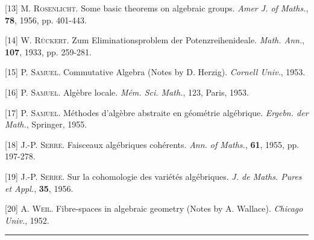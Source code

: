 [13] M. \textsc{Rosenlicht}. Some basic theorems on algebraic groups. \textit{Amer J. of Maths.}, \textbf{78}, 1956, pp. 401-443.

[14] W. \textsc{Rückert}. Zum Eliminationsproblem der Potenzreihenideale. \textit{Math. Ann.}, \textbf{107}, 1933, pp. 259-281.

[15] P. \textsc{Samuel}. Commutative Algebra (Notes by D. Herzig). \textit{Cornell Univ.}, 1953.

[16] P. \textsc{Samuel}. Algèbre locale. \textit{Mém. Sci. Math.}, 123, Paris, 1953.



[17] P. \textsc{Samuel}. Méthodes d'algèbre abstraite en géométrie algébrique. \textit{Ergebn. der Math.}, Springer, 1955.

[18] J.-P. \textsc{Serre}. Faisceaux algébriques cohérents. \textit{Ann. of Maths.}, \textbf{61}, 1955, pp. 197-278.

[19] J.-P. \textsc{Serre}. Sur la cohomologie des variétés algébriques. \textit{J. de Maths. Pures et Appl.}, \textbf{35}, 1956.

[20] A. \textsc{Weil}. Fibre-spaces in algebraic geometry (Notes by A. Wallace). \textit{Chicago Univ.}, 1952.

\begin{center}\rule{4cm}{0.4pt}\end{center}
